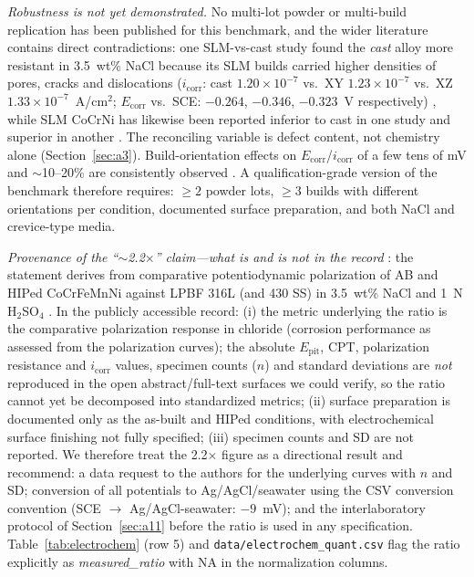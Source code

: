 \emph{Robustness is not yet demonstrated.} No multi-lot powder or multi-build replication has been published for this benchmark, and the wider literature contains direct contradictions: one SLM-vs-cast study found the \emph{cast} alloy more resistant in 3.5~wt\% NaCl because its SLM builds carried higher densities of pores, cracks and dislocations ($i_{\mathrm{corr}}$: cast $1.20\times10^{-7}$ vs.\ XY $1.23\times10^{-7}$ vs.\ XZ $1.33\times10^{-7}$~A/cm$^{2}$; $E_{\mathrm{corr}}$ vs.\ SCE: $-0.264$, $-0.346$, $-0.323$~V respectively) \cite{frontiers2020slmcast}, while SLM CoCrNi has likewise been reported inferior to cast in one study and superior in another \cite{laam_cocrni2021}. The reconciling variable is defect content, not chemistry alone (Section~\ref{sec:a3}). Build-orientation effects on $E_{\mathrm{corr}}$/$i_{\mathrm{corr}}$ of a few tens of mV and $\sim$10--20\% are consistently observed \cite{frontiers2020slmcast,slm_params2024}. A qualification-grade version of the benchmark therefore requires: $\geq2$ powder lots, $\geq3$ builds with different orientations per condition, documented surface preparation, and both NaCl and crevice-type media.

\emph{Provenance of the ``$\sim$2.2$\times$'' claim---what is and is not in the record} \evid{}: the statement derives from comparative potentiodynamic polarization of AB and HIPed CoCrFeMnNi against LPBF 316L (and 430 SS) in 3.5~wt\% NaCl and 1~N H$_2$SO$_4$ \cite{lpbf_cantor_2024}. In the publicly accessible record: (i) the metric underlying the ratio is the comparative polarization response in chloride (corrosion performance as assessed from the polarization curves); the absolute $E_{\mathrm{pit}}$, CPT, polarization resistance and $i_{\mathrm{corr}}$ values, specimen counts ($n$) and standard deviations are \emph{not} reproduced in the open abstract/full-text surfaces we could verify, so the ratio cannot yet be decomposed into standardized metrics; (ii) surface preparation is documented only as the as-built and HIPed conditions, with electrochemical surface finishing not fully specified; (iii) specimen counts and SD are not reported. \prop{} We therefore treat the 2.2$\times$ figure as a directional result and recommend: a data request to the authors for the underlying curves with $n$ and SD; conversion of all potentials to Ag/AgCl/seawater using the CSV conversion convention (SCE $\to$ Ag/AgCl-seawater: $-9$~mV); and the interlaboratory protocol of Section~\ref{sec:a11} before the ratio is used in any specification. Table~\ref{tab:electrochem} (row 5) and \texttt{data/electrochem\_quant.csv} flag the ratio explicitly as \emph{measured\_ratio} with NA in the normalization columns.

